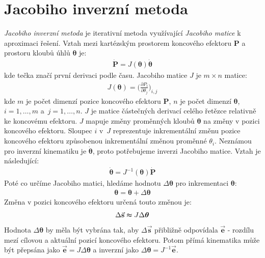 \section{Jacobiho inverzní metoda}
\textit{Jacobiho inverzní metoda} \cite{Buss09introductionto, welman, AristidouTR632} je iterativní metoda využívající \textit{Jacobiho matice} k aproximaci řešení. Vztah mezi kartézským prostorem koncového efektoru $\mathbf{P}$ a prostoru kloubů úhlů $\boldsymbol{\theta}$ je:
\begin{eqnarray}
\mathbf{\dot{P}} = J(\boldsymbol{\theta})\boldsymbol{\dot{\theta}}\label{r.jacobian_vztah}
\end{eqnarray}
kde tečka značí první derivaci podle času. Jacobiho matice $J$ je $m \times n$ matice:
\begin{eqnarray}
J(\boldsymbol{\theta}) = \bigg(\frac{\partial P_i}{\partial \theta_j}\bigg)_{i,j}\label{r.jacobian_matrix}
\end{eqnarray}
kde $m$ je počet dimenzí pozice koncového efektoru $\mathbf{P}$, $n$ je počet dimenzí $\boldsymbol{\theta}$, $i = 1,\dots,m$ a~$j = 1,\dots,n$. $J$ je matice částečných derivací celého řetězce relativně ke koncovému efektoru. $J$ mapuje změny proměnných kloubů $\boldsymbol{\theta}$ na změny v pozici koncového efektoru. Sloupec $i$ v~$J$ reprezentuje inkrementální změnu pozice koncového efektoru způsobenou inkrementální změnou proměnné $\theta_i$. 
Neznámou pro inverzní kinematiku je $\boldsymbol{\dot{\theta}}$, proto potřebujeme inverzi Jacobiho matice. Vztah je následující:
\begin{eqnarray}
\boldsymbol{\dot{\theta}} = J^{-1}(\boldsymbol{\theta})\mathbf{\dot{P}}\label{r.jacobian_vztah_inverse}
\end{eqnarray}
Poté co určíme Jacobiho matici, hledáme hodnotu $\Delta\boldsymbol{\theta}$ pro inkrementaci $\boldsymbol{\theta}$:
\begin{eqnarray}
\boldsymbol{\theta} = \boldsymbol{\theta} + \Delta\boldsymbol{\theta}\label{r.jacobian_increment}
\end{eqnarray}
Změna v pozici koncového efektoru určená touto změnou je:
\begin{eqnarray}
\Delta\vec{\mathbf{s}} \thickapprox J\Delta\boldsymbol{\theta}\label{r.jacobian_change}
\end{eqnarray}
Hodnota $\Delta\boldsymbol{\theta}$ by měla být vybrána tak, aby $\Delta\vec{\mathbf{s}}$ přibližně odpovídala $\vec{\mathbf{e}}$ - rozdílu mezí cílovou a aktuální pozicí koncového efektoru. Potom přímá kinematika může být přepsána jako $\vec{\mathbf{e}} = J\Delta\boldsymbol{\theta}$ a inverzní jako $\Delta\boldsymbol{\theta} = J^{-1}\vec{\mathbf{e}}$.

